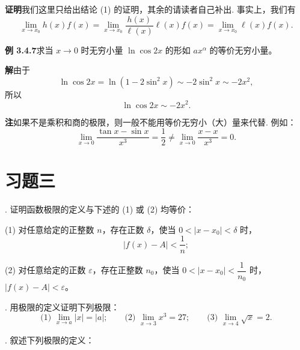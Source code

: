 \documentclass[UTF8, 12pt, fontset=fandol, oneside]{ctexart}
\begin{document}
\noindent\textbf{证明}\quad 我们这里只给出结论 (1) 的证明，其余的请读者自己补出. 事实上，我们有
\[
  \lim_{x\to x_0}h(x)f(x)
  =
  \lim_{x\to x_0}\frac{h(x)}{\ell(x)}\ell(x)f(x)
  =
  \lim_{x\to x_0}\ell(x)f(x).
\]

\noindent\textbf{例 3.4.7}\quad 求当 $x\to0$ 时无穷小量 $\ln\cos 2x$ 的形如 $ax^\alpha$ 的等价无穷小量。

\noindent\textbf{解}\quad 由于
\[
  \ln\cos 2x
  =
  \ln(1-2\sin^2x)
  \sim
  -2\sin^2x
  \sim
  -2x^2,
\]
所以
\[
  \ln\cos 2x\sim -2x^2.
\]

\noindent\textbf{注}\quad 如果不是乘积和商的极限，则一般不能用等价无穷小（大）量来代替. 例如：
\[
  \lim_{x\to0}\frac{\tan x-\sin x}{x^3}
  =
  \frac12
  \ne
  \lim_{x\to0}\frac{x-x}{x^3}
  =
  0.
\]

\section*{习题三}

. 证明函数极限的定义与下述的 (1) 或 (2) 均等价：

(1) 对任意给定的正整数 $n$，存在正数 $\delta$，使当 $0<|x-x_0|<\delta$ 时，
\[
  |f(x)-A|<\frac1n;
\]

(2) 对任意给定的正数 $\varepsilon$，存在正整数 $n_0$，使当 $0<|x-x_0|<\dfrac1{n_0}$ 时，$|f(x)-A|<\varepsilon$。

. 用极限的定义证明下列极限：
\[
  \text{(1) }\lim_{x\to a}|x|=|a|;\qquad
  \text{(2) }\lim_{x\to3}x^3=27;\qquad
  \text{(3) }\lim_{x\to4}\sqrt{x}=2.
\]

. 叙述下列极限的定义：
\end{document}
